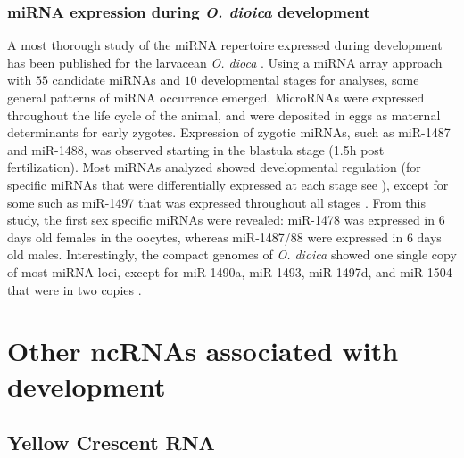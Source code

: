\documentclass[graybox]{svmult}
\begin{document}
\subsubsection{miRNA expression during \textit{O. dioica} development}
A most thorough study of the miRNA repertoire expressed during development has 
been published for the larvacean \textit{O. dioca} \citep{Fu:08}. Using a 
miRNA array approach with $55$ candidate miRNAs and $10$ developmental stages 
for analyses, some general patterns of miRNA occurrence emerged. MicroRNAs were 
expressed throughout the life cycle of the animal, and were deposited in eggs 
as maternal determinants for early zygotes. Expression of zygotic miRNAs, such 
as miR-1487 and miR-1488, was observed starting in the blastula stage (1.5h 
post fertilization). Most miRNAs analyzed showed developmental regulation (for 
specific miRNAs that were differentially expressed at each stage see 
\citep{Fu:08}), except for some such as miR-1497 that was expressed throughout 
all stages \citep{Fu:08}. From this study, the first sex specific miRNAs were 
revealed: miR-1478 was expressed in $6$ days old females in the 
oocytes, whereas miR-1487/88 were expressed in $6$ days old males. 
Interestingly, the compact genomes of \textit{O. dioica} showed one single copy 
of most miRNA loci, except for miR-1490a, miR-1493, miR-1497d, and miR-1504 
that were in two copies \citep{Fu:08}.


\section{Other ncRNAs associated with development}
\label{sec:4}

\subsection{Yellow Crescent RNA}
\end{document}
